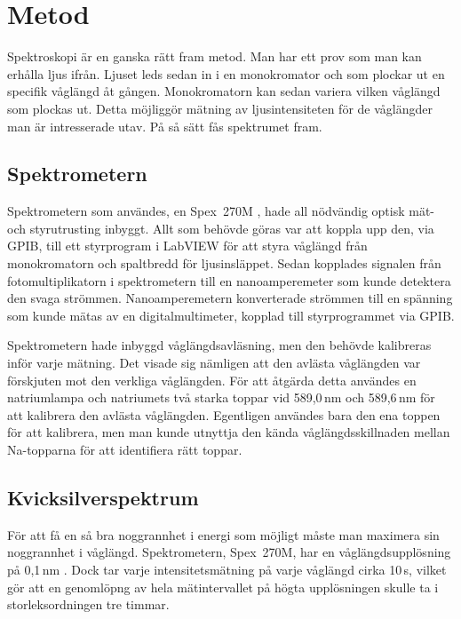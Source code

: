 \documentclass[11pt,a4paper]{article}
\begin{document}
\section{Metod}
Spektroskopi är en ganska rätt fram metod. Man har ett prov som man
kan erhålla ljus ifrån. Ljuset leds sedan in i en monokromator och som
plockar ut en specifik våglängd åt gången. Monokromatorn kan sedan
variera vilken våglängd som plockas ut. Detta möjliggör mätning av
ljusintensiteten för de våglängder man är intresserade utav. På så
sätt fås spektrumet fram.

\subsection{Spektrometern}

Spektrometern som användes, en Spex~270M \cite{Spex270M}, hade all
nödvändig optisk mät- och styrutrusting inbyggt. Allt som behövde
göras var att koppla upp den, via GPIB, till ett styrprogram i LabVIEW
för att styra våglängd från monokromatorn och spaltbredd för
ljusinsläppet. Sedan kopplades signalen från fotomultiplikatorn i
spektrometern till en nanoamperemeter som kunde detektera den svaga
strömmen. Nanoamperemetern konverterade strömmen till en spänning som
kunde mätas av en digitalmultimeter, kopplad till styrprogrammet via
GPIB. 

Spektrometern hade inbyggd våglängdsavläsning, men den behövde
kalibreras inför varje mätning. Det visade sig nämligen att den
avlästa våglängden var förskjuten mot den verkliga våglängden. För att
åtgärda detta användes en natriumlampa och natriumets två starka
toppar vid 589,0\,nm och 589,6\,nm för att kalibrera den avlästa
våglängden. Egentligen användes bara den ena toppen för att kalibrera,
men man kunde utnyttja den kända våglängdsskillnaden mellan
Na-topparna för att identifiera rätt toppar. 




\subsection{Kvicksilverspektrum}
För att få en så bra noggrannhet i energi som möjligt måste man
maximera sin noggrannhet i våglängd. Spektrometern, Spex~270M, har en
våglängdsupplösning på 0,1\,nm \cite{Spex270M}. Dock tar varje
intensitetsmätning på varje våglängd cirka 10\,s, vilket gör att en
genomlöpng av hela mätintervallet på högta upplösningen skulle ta i
storleksordningen tre timmar. 
\end{document}
